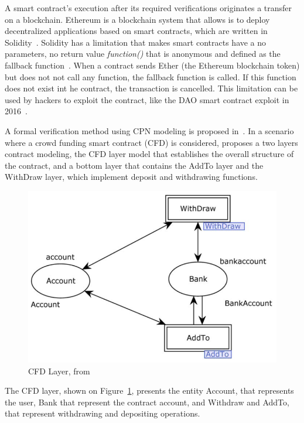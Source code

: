 \documentclass[sigconf, nonacm]{acmart}
\begin{document}
A smart contract's execution after its required verifications originates a transfer on a blockchain. Ethereum is a blockchain system
that allows is to deploy decentralized applications based on smart contracts, which are written in Solidity~\cite{Murray2019}.
Solidity has a limitation that makes smart contracts have a no parameters, no return value \textit{function()} that is anonymous
and defined as the fallback function~\cite{Liu2019}. When a contract sends Ether (the Ethereum blockchain token) but does not
not call any function, the fallback function is called. If this function does not exist int he contract, the transaction is cancelled.
This limitation can be used by hackers to exploit the contract, like the DAO smart contract exploit in 2016~\cite{Liu2019}.

A formal verification method using CPN modeling is proposed in~\cite{Liu2019}. In a scenario where a crowd funding smart contract (CFD) is considered, \cite{Liu2019} proposes a two layers contract modeling, 
the CFD layer model that establishes the overall structure of the contract, and a bottom layer that contains the AddTo layer
and the WithDraw layer, which implement deposit and withdrawing functions.
\begin{figure}[h]
  \centering
  \includegraphics[width=\linewidth]{cfd-layer}
  \caption{CFD Layer, from \cite{Liu2019}}
  \label{fig:cfd-layer}
\end{figure}

The CFD layer, shown on Figure~\ref{fig:cfd-layer}, presents the entity Account, that represents the user, Bank that represent
the contract account, and Withdraw and AddTo, that represent withdrawing and depositing operations.
\end{document}
